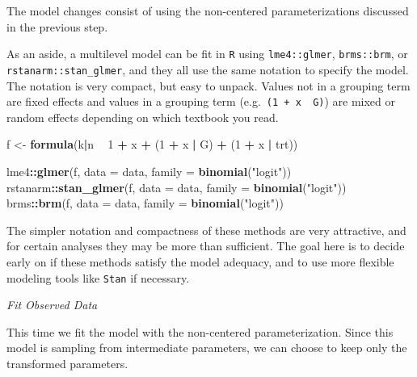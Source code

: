 \documentclass[11pt, oneside, openany]{scrbook}
\newenvironment{Shaded}{\begin{snugshade}}{\end{snugshade}}
\newcommand{\DataTypeTok}[1]{\textcolor[rgb]{0.13,0.29,0.53}{#1}}
\newcommand{\DecValTok}[1]{\textcolor[rgb]{0.00,0.00,0.81}{#1}}
\newcommand{\KeywordTok}[1]{\textcolor[rgb]{0.13,0.29,0.53}{\textbf{#1}}}
\newcommand{\NormalTok}[1]{#1}
\newcommand{\OperatorTok}[1]{\textcolor[rgb]{0.81,0.36,0.00}{\textbf{#1}}}
\newcommand{\StringTok}[1]{\textcolor[rgb]{0.31,0.60,0.02}{#1}}
\begin{document}
The model changes consist of using the non-centered parameterizations discussed in the previous step.

As an aside, a multilevel model can be fit in \texttt{R} using \texttt{lme4::glmer}, \texttt{brms::brm}, or \texttt{rstanarm::stan\_glmer}, and they all use the same notation to specify the model. The notation is very compact, but easy to unpack. Values not in a grouping term are fixed effects and values in a grouping term (e.g.~\texttt{(1\ +\ x\ \textbar{}\ G)}) are mixed or random effects depending on which textbook you read.


\begin{Shaded}
\begin{Highlighting}[]
\NormalTok{f <-}\StringTok{ }\KeywordTok{formula}\NormalTok{(k}\OperatorTok{|}\NormalTok{n }\OperatorTok{~}\StringTok{ }\DecValTok{1} \OperatorTok{+}\StringTok{ }\NormalTok{x }\OperatorTok{+}\StringTok{ }\NormalTok{(}\DecValTok{1} \OperatorTok{+}\StringTok{ }\NormalTok{x }\OperatorTok{|}\StringTok{ }\NormalTok{G) }\OperatorTok{+}\StringTok{ }\NormalTok{(}\DecValTok{1} \OperatorTok{+}\StringTok{ }\NormalTok{x }\OperatorTok{|}\StringTok{ }\NormalTok{trt))}

\NormalTok{lme4}\OperatorTok{::}\KeywordTok{glmer}\NormalTok{(f, }\DataTypeTok{data =}\NormalTok{ data, }\DataTypeTok{family =} \KeywordTok{binomial}\NormalTok{(}\StringTok{"logit"}\NormalTok{))}
\NormalTok{rstanarm}\OperatorTok{::}\KeywordTok{stan_glmer}\NormalTok{(f, }\DataTypeTok{data =}\NormalTok{ data, }\DataTypeTok{family =} \KeywordTok{binomial}\NormalTok{(}\StringTok{"logit"}\NormalTok{))}
\NormalTok{brms}\OperatorTok{::}\KeywordTok{brm}\NormalTok{(f, }\DataTypeTok{data =}\NormalTok{ data, }\DataTypeTok{family =} \KeywordTok{binomial}\NormalTok{(}\StringTok{"logit"}\NormalTok{))}
\end{Highlighting}
\end{Shaded}


The simpler notation and compactness of these methods are very attractive, and for certain analyses they may be more than sufficient. The goal here is to decide early on if these methods satisfy the model adequacy, and to use more flexible modeling tools like \texttt{Stan} if necessary.

\emph{Fit Observed Data}

This time we fit the model with the non-centered parameterization. Since this model is sampling from intermediate parameters, we can choose to keep only the transformed parameters.
\end{document}
